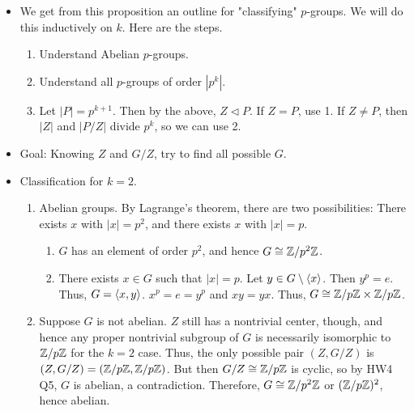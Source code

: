 \documentclass[../notes.tex]{subfiles}
\begin{document}
\begin{itemize}
    \begin{proof}
        To prove that $Z$ is normal, it will suffice to show that for all $x\in Z$ and $g\in G$, $gxg^{-1}\in Z$. Let $x\in Z$ and $g\in G$ be arbitrary. Then since $x\in Z$, $gx=xg$, i.e., $gxg^{-1}=x\in Z$, as desired.\par
        To prove that $Z$ is non-trivial, we make use of the previous proposition. Let $P\acts P$ by conjugation. We first prove that $Z(P)$ is exactly the set of fixed points of $P$. If $x\in P$ is a fixed point, then $pxp^{-1}=x$ for all $p$, so $x\in Z(P)$. In the other direction, if $x\in Z(P)$ normal, then by the definition of the center, $pxp^{-1}=x$ for all $p\in P$. Thus, $|Z(P)|$ is equal to the number of fixed points of $P$, and hence $|Z(P)|\equiv|P|\mod p\equiv 0\mod p$. Thus, we could have $|Z(P)|=0$, but since $e\in Z(P)$, we must instead have $|Z(p)|\geq p$. Therefore, $Z(P)$ is nontrivial.
    \end{proof}
    \item We get from this proposition an outline for "classifying" $p$-groups. We will do this inductively on $k$. Here are the steps.
    \begin{enumerate}
        \item Understand Abelian $p$-groups.
        \item Understand all $p$-groups of order $|p^k|$.
        \item Let $|P|=p^{k+1}$. Then by the above, $Z\triangleleft P$. If $Z=P$, use 1. If $Z\neq P$, then $|Z|$ and $|P/Z|$ divide $p^k$, so we can use 2.
    \end{enumerate}
    \item Goal: Knowing $Z$ and $G/Z$, try to find all possible $G$.
    \item Classification for $k=2$.
    \begin{enumerate}
        \item Abelian groups. By Lagrange's theorem, there are two possibilities: There exists $x$ with $|x|=p^2$, and there exists $x$ with $|x|=p$.
        \begin{enumerate}
            \item $G$ has an element of order $p^2$, and hence $G\cong\mathbb{Z}/p^2\mathbb{Z}$.
            \item There exists $x\in G$ such that $|x|=p$. Let $y\in G\setminus\left\langle{x}\right\rangle$. Then $y^p=e$. Thus, $G=\left\langle{x,y}\right\rangle$. $x^p=e=y^p$ and $xy=yx$. Thus, $G\cong\mathbb{Z}/p\mathbb{Z}\times\mathbb{Z}/p\mathbb{Z}$.
        \end{enumerate}
        \item Suppose $G$ is not abelian. $Z$ still has a nontrivial center, though, and hence any proper nontrivial subgroup of $G$ is necessarily isomorphic to $\mathbb{Z}/p\mathbb{Z}$ for the $k=2$ case. Thus, the only possible pair $(Z,G/Z)$ is $(Z,G/Z)=(\mathbb{Z}/p\mathbb{Z},\mathbb{Z}/p\mathbb{Z})$. But then $G/Z\cong\mathbb{Z}/p\mathbb{Z}$ is cyclic, so by HW4 Q5, $G$ is abelian, a contradiction. Therefore, $G\cong\mathbb{Z}/p^2\mathbb{Z}$ or $(\mathbb{Z}/p\mathbb{Z})^2$, hence abelian.

\end{enumerate}
\end{itemize}
\end{document}
